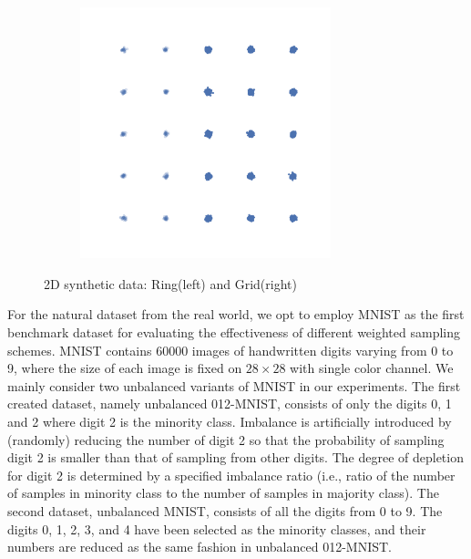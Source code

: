 \begin{description}[leftmargin=0pt]
\begin{figure}[H]
    \hfill
    \begin{subfigure}{0.45\textwidth}
        \centering
        \includegraphics[width=0.8\textwidth]{Figures/Methods/grid_dataset.png}
    \end{subfigure}
    \caption{2D synthetic data: Ring(left) and Grid(right)}
    \label{fig-2d}
\end{figure}

    \item[Unbalanced 012-MNIST/MNIST dataset] For the natural dataset from the real world, we opt to employ MNIST as the first benchmark dataset for evaluating the effectiveness of different weighted sampling schemes. MNIST\cite{lecunGradientbasedLearningApplied1998} contains 60000 images of handwritten digits varying from 0 to 9, where the size of each image is fixed on $28\times 28$ with single color channel. We mainly consider two unbalanced variants of MNIST in our experiments. The first created dataset, namely unbalanced 012-MNIST, consists of only the digits 0, 1 and 2 where digit 2 is the minority class. Imbalance is artificially introduced by (randomly) reducing the number of digit 2 so that the probability of sampling digit 2 is smaller than that of sampling from other digits. The degree of depletion for digit 2 is determined by a specified imbalance ratio (i.e., ratio of the number of samples in minority class to the number of samples in majority class). The second dataset, unbalanced MNIST, consists of all the digits from 0 to 9. The digits 0, 1, 2, 3, and 4 have been selected as the minority classes, and their numbers are reduced as the same fashion in unbalanced 012-MNIST.  


\end{description}
